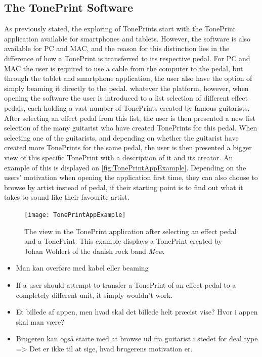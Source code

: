 \subsection{The TonePrint Software}
\label{TonePrintSoftware}
As previously stated, the exploring of TonePrints start with the TonePrint application available for smartphones and tablets. However, the software is also available for PC and MAC, and the reason for this distinction lies in the difference of how a TonePrint is transferred to its respective pedal. For PC and MAC the user is required to use a cable from the computer to the pedal, but through the tablet and smartphone application, the user also have the option of simply beaming it directly to the pedal. whatever the platform, however, when opening the software the user is introduced to a list selection of different effect pedals, each holding a vast number of TonePrints created by famous guitarists. After selecting an effect pedal from this list, the user is then presented a new list selection of the many guitarist who have created TonePrints for this pedal. When selecting one of the guitarists, and depending on whether the guitarist have created more TonePrints for the same pedal, the user is then presented a bigger view of this specific TonePrint with a description of it and its creator. An example of this is displayed on \autoref{fig:TonePrintAppExample}. Depending on the users' motivation when opening the application first time, they can also choose to browse by artist instead of pedal, if their starting point is to find out what it takes to sound like their favourite artist.

\begin{figure}[H]
	\centering
	\texttt{[image: TonePrintAppExample]}
	\caption{The view in the TonePrint application after selecting an effect pedal and a TonePrint. This example displays a TonePrint created by Johan Wohlert of the danish rock band \textit{Mew}.}
	\label{fig:TonePrintAppExample}
\end{figure}
\noindent

\begin{itemize}
	\item Man kan overføre med kabel eller beaming
	\item If a user should attempt to transfer a TonePrint of an effect pedal to a completely different unit, it simply wouldn't work.
	\item Et billede af appen, men hvad skal det billede helt præcist vise? Hvor i appen skal man være?
	\item Brugeren kan også starte med at browse ud fra guitarist i stedet for deal type => Det er ikke til at sige, hvad brugerens motivation er.
\end{itemize}

